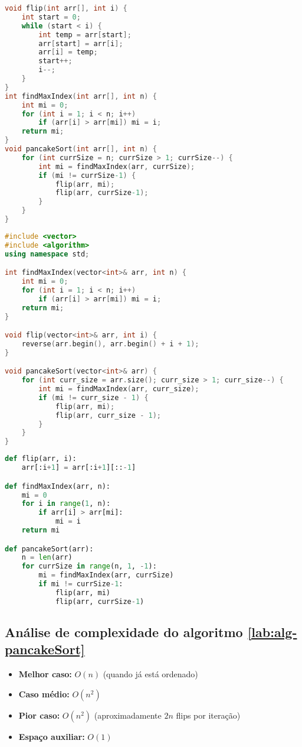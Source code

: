 \begin{lstlisting}[language=C,caption={Pancake sort em C},captionpos=t]
void flip(int arr[], int i) {
    int start = 0;
    while (start < i) {
        int temp = arr[start];
        arr[start] = arr[i];
        arr[i] = temp;
        start++;
        i--;
    }
}
int findMaxIndex(int arr[], int n) {
    int mi = 0;
    for (int i = 1; i < n; i++)
        if (arr[i] > arr[mi]) mi = i;
    return mi;
}
void pancakeSort(int arr[], int n) {
    for (int currSize = n; currSize > 1; currSize--) {
        int mi = findMaxIndex(arr, currSize);
        if (mi != currSize-1) {
            flip(arr, mi);
            flip(arr, currSize-1);
        }
    }
}
\end{lstlisting}

\begin{lstlisting}[language=C++,caption={Pancake sort em C++},captionpos=t]
#include <vector>
#include <algorithm>
using namespace std;

int findMaxIndex(vector<int>& arr, int n) {
    int mi = 0;
    for (int i = 1; i < n; i++)
        if (arr[i] > arr[mi]) mi = i;
    return mi;
}

void flip(vector<int>& arr, int i) {
    reverse(arr.begin(), arr.begin() + i + 1);
}

void pancakeSort(vector<int>& arr) {
    for (int curr_size = arr.size(); curr_size > 1; curr_size--) {
        int mi = findMaxIndex(arr, curr_size);
        if (mi != curr_size - 1) {
            flip(arr, mi);
            flip(arr, curr_size - 1);
        }
    }
}
\end{lstlisting}

\begin{lstlisting}[language=python,caption={Pancake sort em Python},captionpos=t]
def flip(arr, i):
    arr[:i+1] = arr[:i+1][::-1]

def findMaxIndex(arr, n):
    mi = 0
    for i in range(1, n):
        if arr[i] > arr[mi]:
            mi = i
    return mi

def pancakeSort(arr):
    n = len(arr)
    for currSize in range(n, 1, -1):
        mi = findMaxIndex(arr, currSize)
        if mi != currSize-1:
            flip(arr, mi)
            flip(arr, currSize-1)
\end{lstlisting}

\subsection{Análise de complexidade do algoritmo \ref{lab:alg-pancakeSort}}
\begin{itemize}
    \item \textbf{Melhor caso:} $O(n)$ (quando já está ordenado)
    \item \textbf{Caso médio:} $O(n^2)$
    \item \textbf{Pior caso:} $O(n^2)$ (aproximadamente $2n$ flips por iteração)
    \item \textbf{Espaço auxiliar:} $O(1)$
\end{itemize}


